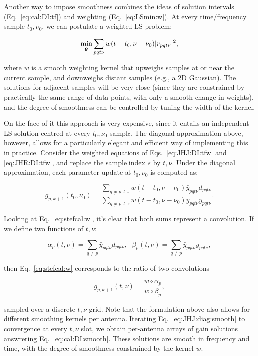 \documentclass[useAMS,usenatbib]{mn2e}
\begin{document}
Another way to impose smoothness combines the ideas of solution intervals  (Eq.~\ref{eq:cal:DI:tf}) 
and weighting (Eq.~\ref{eq:LSmin:w}). At every time/frequency sample $t_0,\nu_0$, we can postulate a weighted 
LS problem:

\begin{equation}
\label{eq:cal:DI:smooth}
\min_{\bmath{g}}\sum_{pqt\nu}w(t-t_0,\nu-\nu_0)|r_{pqt\nu}|^2, 
\end{equation}

where $w$ is a smooth weighting kernel that upweighs samples at or near the current sample, and downweighs distant 
samples (e.g., a 2D Gaussian). The solutions for adjacent samples will be very close (since they 
are constrained by practically the same range of data points, with only a smooth change in weights), and the 
degree of smoothness can be controlled by tuning the width of the kernel.

On the face of it this approach is very expensive, since it entails an independent LS solution centred at 
every $t_0,\nu_0$ sample. The diagonal approximation above, however, allows for a particularly elegant and efficient way of 
implementing this in practice. Consider the weighted equations of Eqs.~\ref{eq:JHJ:DI:tfw} and \ref{eq:JHR:DI:tfw}, 
and replace the sample index $s$ by $t,\nu$. Under the diagonal approximation, each parameter update at $t_0,\nu_0$ is 
computed as:

\begin{equation}
\label{eq:stefcal:w}
g_{p,{k+1}}(t_0,\nu_0) = \frac{\sum\limits_{q\ne p,t,\nu} w(t-t_0,\nu-\nu_0) \bar{y}_{pqt\nu} d_{pqt\nu} }
{\sum\limits_{q\ne p,t,\nu} w(t-t_0,\nu-\nu_0) \bar{y}_{pqt\nu} y_{pqt\nu}}.
\end{equation}

Looking at Eq.~\ref{eq:stefcal:w}, it's clear that both sums represent a convolution. If we define two functions of $t,\nu$:

\[
\alpha_p(t,\nu) = \sum\limits_{q\ne p} \bar{y}_{pqt\nu} d_{pqt\nu},~~~
\beta_p(t,\nu) = \sum\limits_{q\ne p} \bar{y}_{pqt\nu} y_{pqt\nu},
\]

then Eq.~\ref{eq:stefcal:w} corresponds to the ratio of two convolutions

\begin{equation}
\label{eq:JHJ:diag:smooth}
g_{p,k+1}(t,\nu) = \frac{w\circ \alpha_p}{w\circ\beta_p},
\end{equation}

sampled over a discrete $t,\nu$ grid. Note that the formulation above also allows for different smoothing kernels per antenna.
Iterating Eq.~\ref{eq:JHJ:diag:smooth} to convergence at every $t,\nu$ slot, we obtain per-antenna arrays of gain solutions 
answrering Eq.~\ref{eq:cal:DI:smooth}. These solutions are smooth in frequency and time, with the degree of smoothness 
constrained by the kernel $w$. 
\end{document}
